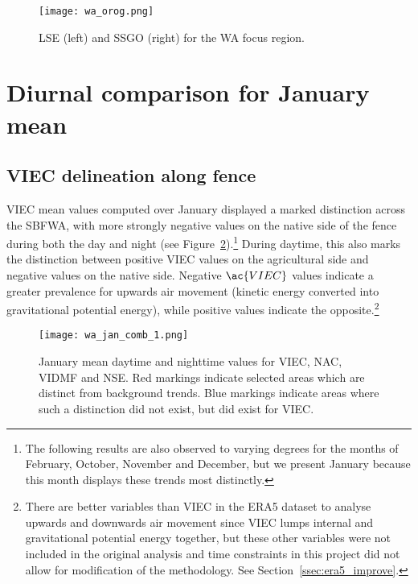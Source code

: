 \begin{figure}[!ht]
	\centering
	\texttt{[image: wa\_orog.png]}
	\caption[Orography for WA focus region]{\acf{LSE} (left) and \acf{SSGO} (right) for the \ac{WA} focus region.}
	\label{fig:wa_orog}
\end{figure}

\section{Diurnal comparison for January mean}
\label{sec:comp_diurnal}

\subsection{VIEC delineation along fence}

\ac{VIEC} mean values computed over January displayed a marked distinction across the \acf{SBFWA}, with more strongly negative values on the native side of the fence during both the day and night (see Figure~\ref{fig:wa_jan_comb_1}).\footnote{The following results are also observed to varying degrees for the months of February, October, November and December, but we present January because this month displays these trends most distinctly.} During daytime, this also marks the distinction between positive \ac{VIEC} values on the agricultural side and negative values on the native side. Negative $\ac{VIEC}$ values indicate a greater prevalence for upwards air movement (kinetic energy converted into gravitational potential energy), while positive values indicate the opposite.\footnote{There are better variables than \ac{VIEC} in the ERA5 dataset to analyse upwards and downwards air movement since \ac{VIEC} lumps internal and gravitational potential energy together, but these other variables were not included in the original analysis and time constraints in this project did not allow for modification of the methodology. See Section~\ref{ssec:era5_improve}.}

\begin{figure}[!ht]
	\centering
	\texttt{[image: wa\_jan\_comb\_1.png]}
	\caption[January means for selected variables 1]{January mean daytime and nighttime values for \acs{VIEC}, \acs{NAC}, \acs{VIDMF} and \acs{NSE}. Red markings indicate selected areas which are distinct from background trends. Blue markings indicate areas where such a distinction did not exist, but did exist for \acs{VIEC}.}
	\label{fig:wa_jan_comb_1}
\end{figure}


